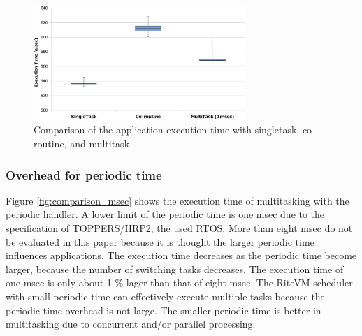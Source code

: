 \documentclass{sig-alternate-05-2015}
\providecommand{\DIFdel}[1]{{\protect\color{red}\sout{#1}}}                      %
\providecommand{\DIFdelbegin}{} %
\providecommand{\DIFdelend}{} %
\begin{document}
\begin{figure}[t]
    \centering
    \includegraphics[width=8cm,clip]{figure/comparison_s_c_m.eps}
    \vspace{1mm}
\caption{Comparison of the application execution time with singletask, co-routine, and multitask}
    \vspace{1mm}
\label{fig:comparison_s_c_m}
\end{figure}

\DIFdelbegin \subsubsection{\DIFdel{Overhead for periodic time}}
\addtocounter{subsubsection}{-1}%
\DIFdelend %
Figure \ref{fig:comparison_msec} shows the execution time of multitasking with the periodic handler.
A lower limit of the periodic time is one msec due to the specification of TOPPERS/HRP2, the used RTOS.
More than eight msec do not be evaluated in this paper because it is thought the larger periodic time influences applications.
The execution time decreases as the periodic time become larger, because the number of switching tasks decreases.
The execution time of one msec is only about 1 \% lager than that of eight msec.
The RiteVM scheduler with small periodic time can effectively execute multiple tasks because the periodic time overhead is not large.
The smaller periodic time is better in multitasking due to concurrent and/or parallel processing.
\end{document}
